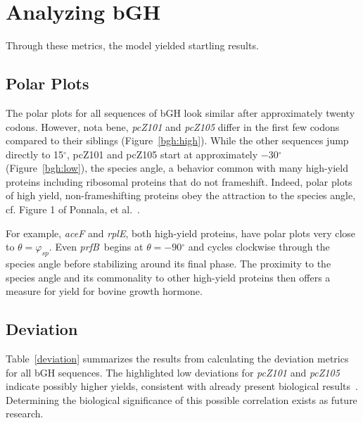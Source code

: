 \documentclass[10pt,twocolumn]{article}
\newcommand{\degree}{\ensuremath{^\circ}}
\newcommand{\prfB}{\emph{prfB}}
\begin{document}
\section{Analyzing bGH}

Through these metrics, the model yielded startling results.

\subsection{Polar Plots}

The polar plots for all sequences of bGH look similar after approximately twenty codons.  
However, nota bene, \emph{pcZ101} and \emph{pcZ105} differ in the first few codons compared to
their siblings (Figure~\ref{bgh:high}).
While the other sequences jump directly to 15$\degree$, pcZ101 and pcZ105 start at approximately $-30\degree$
(Figure~\ref{bgh:low}),
the species angle, a behavior common with many high-yield proteins including ribosomal proteins that do not
frameshift. Indeed, polar plots of high yield, non-frameshifting proteins obey the attraction to the species
angle, cf. Figure 1 of Ponnala, et al.~\cite{lalit:mechanics}.

For example, \emph{aceF} and \emph{rplE}, both high-yield proteins, have polar plots very close to $\theta = \varphi_{sp}$.
Even \prfB\ begins at $\theta = -90\degree$ and cycles clockwise through the species angle before
stabilizing around its final phase. The proximity to the species angle and its commonality to
other high-yield proteins then offers a measure for yield for bovine growth hormone.


\subsection{Deviation}

Table~\ref{deviation} summarizes the results from calculating the deviation metrics 
for all bGH sequences. The highlighted low deviations for \emph{pcZ101} and {\it pcZ105}
indicate possibly higher yields, consistent with already present biological results~\cite{schoner:bgh}.
Determining the biological significance of this possible correlation exists as future research.
\end{document}
